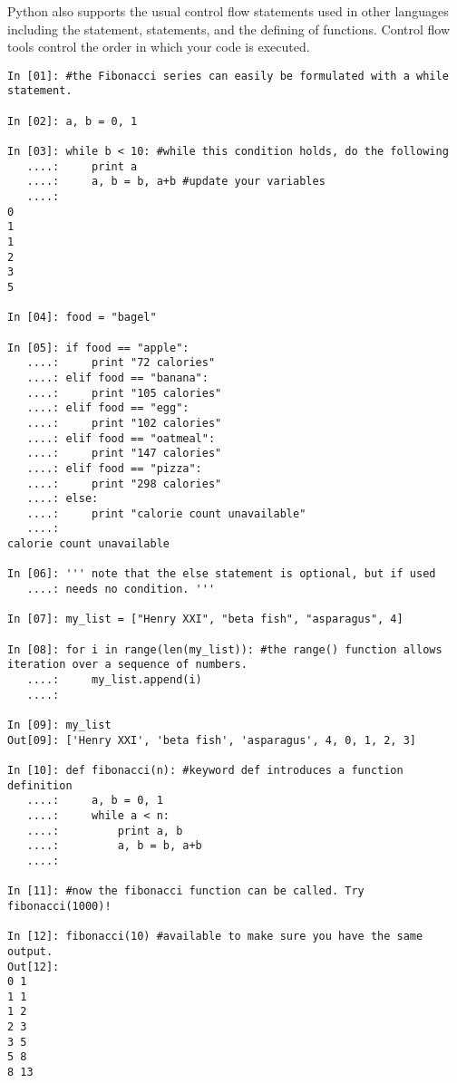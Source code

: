 \begin{example}
Python also supports the usual control flow statements used in other languages
including the  statement,  statements, and the defining of functions. 
Control flow tools control the order in which your code is executed. 
\begin{lstlisting}
In [01]: #the Fibonacci series can easily be formulated with a while statement.

In [02]: a, b = 0, 1

In [03]: while b < 10: #while this condition holds, do the following
   ....:     print a
   ....:     a, b = b, a+b #update your variables
   ....:     
0
1
1
2
3
5

In [04]: food = "bagel"

In [05]: if food == "apple":
   ....:     print "72 calories"
   ....: elif food == "banana":
   ....:     print "105 calories"
   ....: elif food == "egg":
   ....:     print "102 calories"
   ....: elif food == "oatmeal":
   ....:     print "147 calories"
   ....: elif food == "pizza":
   ....:     print "298 calories"
   ....: else: 
   ....:     print "calorie count unavailable"
   ....:     
calorie count unavailable

In [06]: ''' note that the else statement is optional, but if used
   ....: needs no condition. '''
   
In [07]: my_list = ["Henry XXI", "beta fish", "asparagus", 4]

In [08]: for i in range(len(my_list)): #the range() function allows iteration over a sequence of numbers. 
   ....:     my_list.append(i)
   ....:     

In [09]: my_list
Out[09]: ['Henry XXI', 'beta fish', 'asparagus', 4, 0, 1, 2, 3]

In [10]: def fibonacci(n): #keyword def introduces a function definition
   ....:     a, b = 0, 1
   ....:     while a < n:
   ....:         print a, b
   ....:         a, b = b, a+b
   ....:         

In [11]: #now the fibonacci function can be called. Try fibonacci(1000)!

In [12]: fibonacci(10) #available to make sure you have the same output.
Out[12]:
0 1
1 1
1 2
2 3
3 5
5 8
8 13

\end{lstlisting}
\end{example}

